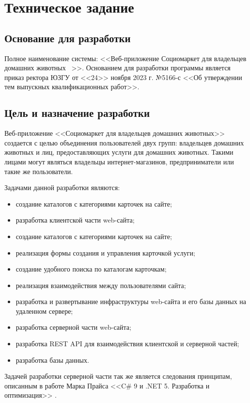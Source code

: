 \section{Техническое задание}
\subsection{Основание для разработки}

Полное наименование системы: <<Веб-приложение \textquotedbl Социомаркет для владельцев домашних животных \textquotedbl\ >>.
Основанием для разработки программы является приказ ректора ЮЗГУ от <<24>> ноября 2023 г. №5166-с <<Об утверждении тем выпускных квалификационных работ>>.

\subsection{Цель и назначение разработки}

Веб-приложение <<Социомаркет для владельцев домашних животных>> создается с целью объединения пользователей двух групп: владельцев домашних животных и лиц, предоставляющих услуги для домашних животных. Такими лицами могут являться владельцы интернет-магазинов, предприниматели или такие же пользователи.

Задачами данной разработки являются:
\begin{itemize}
\item создание каталогов с категориями карточек на сайте;
\item разработка клиентской части web-сайта;
\item создание каталогов с категориями карточек на сайте;
\item реализация формы создания и управления карточкой услуги;
\item создание удобного поиска по каталогам карточкам;
\item реализация взаимодействия между пользователями сайта;
\item разработка и развертывание инфраструктуры web-сайта и его базы данных на удаленном сервере;
\item разработка серверной части web-сайта;
\item разработка REST API для взаимодействия клиентской и серверной частей;
\item разработка базы данных.
\end{itemize}

Задачей разработки серверной части так же является следования принципам, описанным в работе Марка Прайса <<C\# 9 и .NET 5. Разработка и оптимизация>> \cite{mark_price}.

